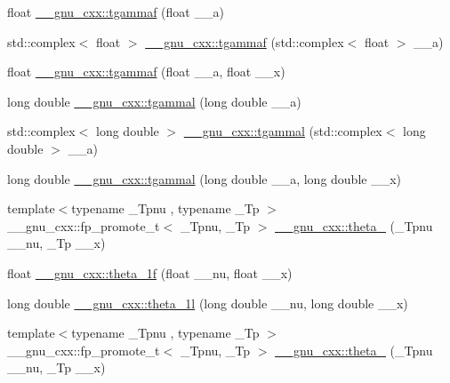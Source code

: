 \begin{DoxyCompactItemize}
\item 
float \hyperlink{group__gnu__math__spec__func_ga008b1f4cc3a54c9c8221ad1f3504b593}{\+\_\+\+\_\+gnu\+\_\+cxx\+::tgammaf} (float \+\_\+\+\_\+a)
\item 
std\+::complex$<$ float $>$ \hyperlink{group__gnu__math__spec__func_gaf548b80db1501cbc067de1564e721972}{\+\_\+\+\_\+gnu\+\_\+cxx\+::tgammaf} (std\+::complex$<$ float $>$ \+\_\+\+\_\+a)
\item 
float \hyperlink{group__gnu__math__spec__func_ga942773871e9c21a50cf13ec160e7e8d9}{\+\_\+\+\_\+gnu\+\_\+cxx\+::tgammaf} (float \+\_\+\+\_\+a, float \+\_\+\+\_\+x)
\item 
long double \hyperlink{group__gnu__math__spec__func_ga2c7d954852d84665aabd43566d67e344}{\+\_\+\+\_\+gnu\+\_\+cxx\+::tgammal} (long double \+\_\+\+\_\+a)
\item 
std\+::complex$<$ long double $>$ \hyperlink{group__gnu__math__spec__func_ga8d53515dba9c860fd6058a4b75aaff58}{\+\_\+\+\_\+gnu\+\_\+cxx\+::tgammal} (std\+::complex$<$ long double $>$ \+\_\+\+\_\+a)
\item 
long double \hyperlink{group__gnu__math__spec__func_gabebff9ffba6acf55f3a3cd716ef5007a}{\+\_\+\+\_\+gnu\+\_\+cxx\+::tgammal} (long double \+\_\+\+\_\+a, long double \+\_\+\+\_\+x)
\item 
{\footnotesize template$<$typename \+\_\+\+Tpnu , typename \+\_\+\+Tp $>$ }\\\+\_\+\+\_\+gnu\+\_\+cxx\+::fp\+\_\+promote\+\_\+t$<$ \+\_\+\+Tpnu, \+\_\+\+Tp $>$ \hyperlink{group__gnu__math__spec__func_gaa2e5a3a5f550fe032a596a8b01c878c0}{\+\_\+\+\_\+gnu\+\_\+cxx\+::theta\+\_} (\+\_\+\+Tpnu \+\_\+\+\_\+nu, \+\_\+\+Tp \+\_\+\+\_\+x)
\item 
float \hyperlink{group__gnu__math__spec__func_ga5bbf256b875da28132f9049f5984cb14}{\+\_\+\+\_\+gnu\+\_\+cxx\+::theta\+\_\+1f} (float \+\_\+\+\_\+nu, float \+\_\+\+\_\+x)
\item 
long double \hyperlink{group__gnu__math__spec__func_ga3520684c78771ffa57180060c8b6d1ca}{\+\_\+\+\_\+gnu\+\_\+cxx\+::theta\+\_\+1l} (long double \+\_\+\+\_\+nu, long double \+\_\+\+\_\+x)
\item 
{\footnotesize template$<$typename \+\_\+\+Tpnu , typename \+\_\+\+Tp $>$ }\\\+\_\+\+\_\+gnu\+\_\+cxx\+::fp\+\_\+promote\+\_\+t$<$ \+\_\+\+Tpnu, \+\_\+\+Tp $>$ \hyperlink{group__gnu__math__spec__func_ga16f278edeb2842d614bae1f1ae2d0256}{\+\_\+\+\_\+gnu\+\_\+cxx\+::theta\+\_} (\+\_\+\+Tpnu \+\_\+\+\_\+nu, \+\_\+\+Tp \+\_\+\+\_\+x)
\item 

\end{DoxyCompactItemize}
